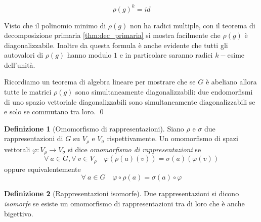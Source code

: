 \documentclass[11pt]{article}
\theoremstyle{plain}
\theoremstyle{definition}
\newtheorem{defn}{Definizione}[section]
\theoremstyle{remark}
\begin{document}
\[ \rho(g)^k = id\]

Visto che il polinomio minimo di $\rho(g)$ non ha radici multiple, con il teorema di decomposizione primaria \eqref{thm:dec_primaria} si mostra facilmente che $\rho(g)$ è diagonalizzabile. Inoltre da questa formula è anche evidente che tutti gli autovalori di $\rho(g)$ hanno modulo $1$ e in particolare saranno radici $k-$esime dell'unità.

Ricordiamo un teorema di algebra lineare per mostrare che se $G$ è abeliano allora
tutte le matrici $\rho(g)$ sono simultaneamente diagonalizzabili:
due endomorfismi di uno spazio vettoriale diagonalizzabili sono simultaneamente diagonalizzabili se e solo se commutano tra loro.
\qed




\begin{defn}[Omomorfismo di rappresentazioni]
Siano $\rho$ e $\sigma$ due rappresentazioni di $G$ su $V_{\rho}$ e $V_{\sigma}$ rispettivamente. Un omomorfismo di spazi vettorali $\varphi:V_{\rho}\to V_{\sigma}$ si dice \textit{omomorfismo di rappresentazioni} se
\[
	\forall\ a\in G, \forall\ v\in V_{\rho}\quad \varphi(\rho(a)(v)) = \sigma(a)(\varphi(v))
\]
oppure equivalentemente
\[
	\forall\ a\in G\quad \varphi\circ \rho(a) = \sigma(a)\circ \varphi
\]






\end{defn}



\begin{defn}[Rappresentazioni isomorfe]
Due rappresentazioni si dicono \textit{isomorfe} se esiste un omomorfismo di rappresentazioni tra di loro che è anche bigettivo.
\end{defn}
\end{document}
